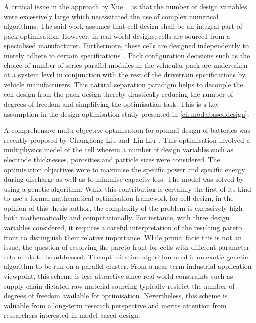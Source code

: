 
A critical issue in the approach  by Xue~\etal~\cite{Xue2014} is that the number
of design variables were excessively large which necessitated the use of complex
numerical  algorithms. The  said  work  assumes that  cell  design  shall be  an
integral part  of pack optimisation.  However, in real-world designs,  cells are
sourced from a  specialised manufacturer. Furthermore, these  cells are designed
independently to merely  adhere to certain specifications~\cite{Maksimovic2012}.
Pack configuration  decisions such  as the choice  of number  of series-parallel
modules in  the vehicular pack are  undertaken at a system  level in conjunction
with the  rest of the  drivetrain specifications by vehicle  manufacturers. This
natural separation  paradigm helps  to decouple  the cell  design from  the pack
design  thereby  drastically reducing  the  number  of  degrees of  freedom  and
simplifying  the optimisation  task.  This is  a key  assumption  in the  design
optimisation study presented in \cref{ch:modelbaseddesign}.

\addlines[1.5]
A  comprehensive multi-objective  optimisation for  optimal design  of batteries
was  recently  proposed  by  Changhong  Liu  and~Lin  Liu~\cite{Liu2017b}.  This
optimisation  involved a  multiphysics model  of the  cell wherein  a number  of
design variables  such as electrode  thicknesses, porosities and  particle sizes
were considered. The optimisation objectives were to maximise the specific power
and specific energy  during discharge as well as to  minimise capacity loss. The
model  was solved  by  using a  genetic algorithm.  While  this contribution  is
certainly  the first  of  its kind  to use  a  formal mathematical  optimisation
framework for cell design, in the  opinion of this thesis author, the complexity
of the problem is excessively  high --- both mathematically and computationally.
For  instance, with  three design  variables considered,  it requires  a careful
interpretation  of the  resulting  pareto front  to  distinguish their  relative
importance. While  prima~facie this is not  an issue, the question  of resolving
the pareto front for cells with  different parameter sets needs to be addressed.
The optimisation algorithm  used is an exotic  genetic algorithm to be  run on a
parallel cluster. From a near-term industrial application viewpoint, this scheme
is less  attractive since real-world  constraints such as  supply-chain dictated
raw-material  sourcing  typically restrict  the  number  of degrees  of  freedom
available  for  optimisation.  Nevertheless,  this scheme  is  valuable  from  a
long-term research perspective and  merits attention from researchers interested
in model-based design.

